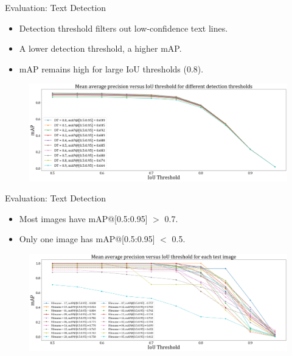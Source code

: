 \documentclass{beamer}
\begin{document}
\begin{frame}
    \begin{center}
        \Large{Evaluation: Text Detection}
    \end{center}
    \begin{itemize}
        \item Detection threshold filters out low-confidence text lines.
        \item A lower detection threshold, a higher mAP.
        \item mAP remains high for large IoU thresholds (0.8).
    \end{itemize}
    \begin{figure}
        \centering
        \includegraphics[width=\textwidth]{figures/map1.png}
    \end{figure}
\end{frame}

\begin{frame}
    \begin{center}
        \Large{Evaluation: Text Detection}
    \end{center}
    \begin{itemize}
        \item Most images have mAP@[0.5:0.95] $>$ 0.7.
        \item Only one image has mAP@[0.5:0.95] $<$ 0.5.
    \end{itemize}
    \begin{figure}
        \centering
        \includegraphics[width=\textwidth]{figures/map3.png}
    \end{figure}
\end{frame}
\end{document}
